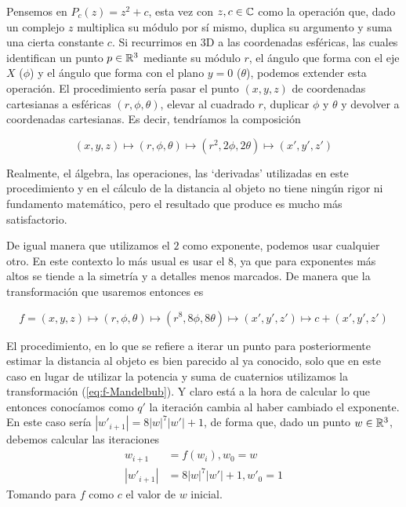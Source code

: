 Pensemos en $P_c(z)=z^2+c$, esta vez con $z,c\in\mathbb{C}$ como la operación que, dado un complejo $z$ multiplica su módulo por sí mismo, duplica su argumento y suma una cierta constante $c$. Si recurrimos en 3D a las coordenadas esféricas, las cuales identifican un punto $p\in\mathbb{R}^3$ mediante su módulo $r$, el ángulo que forma con el eje $X$ ($\phi$) y el ángulo que forma con el plano $y=0$ ($\theta$), podemos extender esta operación. El procedimiento sería pasar el punto $(x,y,z)$ de coordenadas cartesianas a esféricas $(r,\phi,\theta)$, elevar al cuadrado $r$, duplicar $\phi$ y $\theta$ y devolver a coordenadas cartesianas. Es decir, tendríamos la composición 

$$
(x,y,z)\longmapsto(r,\phi,\theta)\longmapsto(r^2,2\phi,2\theta)\longmapsto(x',y',z')
$$

Realmente, el álgebra, las operaciones, las `derivadas' utilizadas en este procedimiento y en el cálculo de la distancia al objeto no tiene ningún rigor ni fundamento matemático, pero el resultado que produce es mucho más satisfactorio.

De igual manera que utilizamos el $2$ como exponente, podemos usar cualquier otro. En este contexto lo más usual es usar el 8, ya que para exponentes más altos se tiende a la simetría y a detalles menos marcados. De manera que la transformación que usaremos entonces es 

\begin{equation}
    \label{eq:f-Mandelbub}
    f=(x,y,z)\longmapsto(r,\phi,\theta)\longmapsto(r^8,8\phi,8\theta)\longmapsto(x',y',z')\longmapsto c + (x',y',z')
\end{equation}


El procedimiento, en lo que se refiere a iterar un punto para posteriormente estimar la distancia al objeto es bien parecido al ya conocido, solo que en este caso en lugar de utilizar la potencia y suma de cuaternios utilizamos la transformación (\ref{eq:f-Mandelbub}). Y claro está a la hora de calcular lo que entonces conocíamos como $q'$ la iteración cambia al haber cambiado el exponente. En este caso sería $|w'_{i+1}|=8|w|^7|w'|+1$, de forma que, dado un punto $w\in\mathbb{R}^3$, debemos calcular las iteraciones 
\begin{equation}
    \begin{split}
        w_{i+1} &= f(w_i), w_0=w \\
        |w'_{i+1}| &= 8|w|^7|w'|+1, w'_0=1
    \end{split}
\end{equation}
Tomando para $f$ como $c$ el valor de $w$ inicial.

